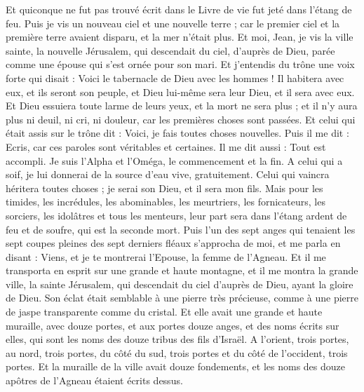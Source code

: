 \begin{multicols}{2}
Et quiconque ne fut pas trouvé écrit dans le Livre de vie fut jeté dans l'étang de feu.
\VerseOne{}Puis je vis un nouveau ciel et une nouvelle terre ; car le premier ciel et la première terre avaient disparu, et la mer n'était plus.
Et moi, Jean, je vis la ville sainte, la nouvelle Jérusalem, qui descendait du ciel, d'auprès de Dieu, parée comme une épouse qui s'est ornée pour son mari.
Et j'entendis du trône une voix forte qui disait : Voici le tabernacle de Dieu avec les hommes ! Il habitera avec eux, et ils seront son peuple, et Dieu lui-même sera leur Dieu, et il sera avec eux.
Et Dieu essuiera toute larme de leurs yeux, et la mort ne sera plus ; et il n'y aura plus ni deuil, ni cri, ni douleur, car les premières choses sont passées.
Et celui qui était assis sur le trône dit : Voici, je fais toutes choses nouvelles. Puis il me dit : Ecris, car ces paroles sont véritables et certaines.
Il me dit aussi : Tout est accompli. Je suis l'Alpha et l'Oméga, le commencement et la fin. A celui qui a soif, je lui donnerai de la source d'eau vive, gratuitement.
Celui qui vaincra héritera toutes choses ; je serai son Dieu, et il sera mon fils.
Mais pour les timides, les incrédules, les abominables, les meurtriers, les fornicateurs, les sorciers, les idolâtres et tous les menteurs, leur part sera dans l'étang ardent de feu et de soufre, qui est la seconde mort.
Puis l'un des sept anges qui tenaient les sept coupes pleines des sept derniers fléaux s'approcha de moi, et me parla en disant : Viens, et je te montrerai l'Epouse, la femme de l'Agneau.
Et il me transporta en esprit sur une grande et haute montagne, et il me montra la grande ville, la sainte Jérusalem, qui descendait du ciel d'auprès de Dieu,
ayant la gloire de Dieu. Son éclat était semblable à une pierre très précieuse, comme à une pierre de jaspe transparente comme du cristal.
Et elle avait une grande et haute muraille, avec douze portes, et aux portes douze anges, et des noms écrits sur elles, qui sont les noms des douze tribus des fils d'Israël.
A l'orient, trois portes, au nord, trois portes, du côté du sud, trois portes et du côté de l'occident, trois portes.
Et la muraille de la ville avait douze fondements, et les noms des douze apôtres de l'Agneau étaient écrits dessus.

\end{multicols}
